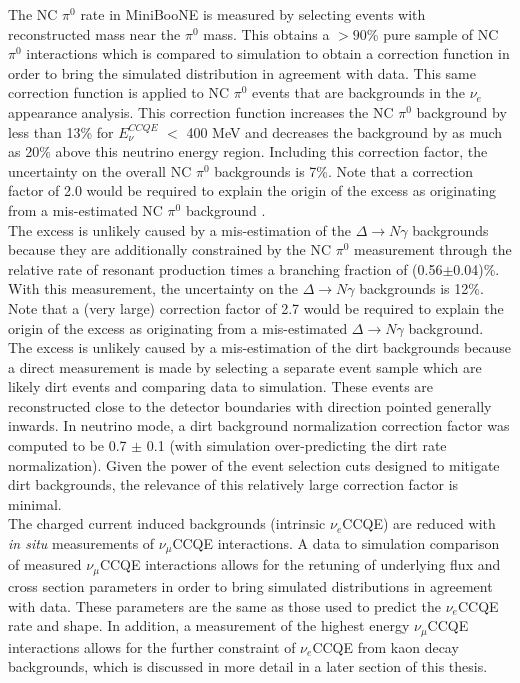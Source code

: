 The NC $\pi^0$ rate in MiniBooNE is measured by selecting events with reconstructed mass near the $\pi^0$ mass. This obtains a $>90$\% pure sample of NC $\pi^0$ interactions which is compared to simulation to obtain a correction function in order to bring the simulated distribution in agreement with data. This same correction function is applied to NC $\pi^0$ events that are backgrounds in the $\nu_e$ appearance analysis. This correction function increases the NC $\pi^0$ background by less than 13\% for $E_\nu^{CCQE}$ $<$ 400 MeV and decreases the background by as much as 20\% above this neutrino energy region. Including this correction factor, the uncertainty on the overall NC $\pi^0$ backgrounds is 7\%. Note that a correction factor of 2.0 would be required to explain the origin of the excess as originating from a mis-estimated NC $\pi^0$ background \cite{GeorgiaThesis}.\\

The excess is unlikely caused by a mis-estimation of the $\Delta\rightarrow N\gamma$ backgrounds because they are additionally constrained by the NC $\pi^0$ measurement through the relative rate of resonant production times a branching fraction of (0.56$\pm$0.04)\%. With this measurement, the uncertainty on the $\Delta\rightarrow N\gamma$ backgrounds is 12\%. Note that a (very large) correction factor of 2.7 would be required to explain the origin of the excess as originating from a mis-estimated $\Delta \rightarrow N\gamma$ background.\\

The excess is unlikely caused by a mis-estimation of the dirt backgrounds because a direct measurement is made by selecting a separate event sample which are likely dirt events and comparing data to simulation. These events are reconstructed close to the detector boundaries with direction pointed generally inwards. In neutrino mode, a dirt background normalization correction factor was computed to be 0.7 $\pm$ 0.1 (with simulation over-predicting the dirt rate normalization). Given the power of the event selection cuts designed to mitigate dirt backgrounds, the relevance of this relatively large correction factor is minimal.\\

The charged current induced backgrounds (intrinsic $\nu_e$CCQE) are reduced with \textit{in situ} measurements of $\nu_\mu$CCQE interactions. A data to simulation comparison of measured $\nu_\mu$CCQE interactions allows for the retuning of underlying flux and cross section parameters in order to bring simulated distributions in agreement with data. These parameters are the same as those used to predict the $\nu_e$CCQE rate and shape. In addition, a measurement of the highest energy $\nu_\mu$CCQE interactions allows for the further constraint of $\nu_e$CCQE from kaon decay backgrounds, which is discussed in more detail in a later section of this thesis.\\

